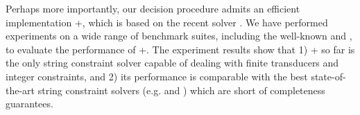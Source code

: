 Perhaps more importantly, our decision procedure admits an efficient implementation {\ostrich}+, which is based on %
the recent {\ostrich} solver \cite{CHL+19}.  We have performed experiments on a wide range of benchmark suites, including the well-known {\kaluzabench} and {\pyexbench}, to evaluate the performance of {\ostrich}+. The experiment results show that  %
1) {\ostrich}+ so far is the only string constraint solver capable of dealing with finite transducers and integer constraints, and 2) its performance is comparable with the best state-of-the-art string constraint solvers (e.g. {\cvc} and {\zthreetrau}) which are short of completeness guarantees. 





